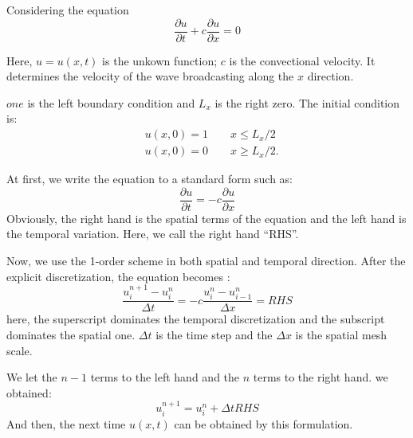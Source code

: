 \documentclass[a4paper]{article}
\begin{document}
\fontsize{12pt}{20pt}\selectfont
Considering the equation
\begin{equation}
  \frac{\partial u}{\partial t}+c\frac{\partial u}{\partial x}=0
\end{equation}

Here, $u=u(x,t)$ is the unkown function; $c$ is the convectional velocity. It determines the velocity of the wave broadcasting along the $x$ direction.

$one$ is the left boundary condition and $L_x$ is the right zero.
The initial condition is:
\begin{equation}
  \begin{split}
  &u(x, 0)=1 \qquad   x\le L_x/2\\
  &u(x, 0)=0 \qquad   x\ge L_x/2.
  \end{split}
\end{equation}

At first, we write the equation to a standard form such as:
\begin{equation}
  \frac{\partial u}{\partial t}=-c\frac{\partial u}{\partial x}
\end{equation}
Obviously, the right hand is the spatial terms of the equation and the left hand is the temporal variation. Here, we call the right hand ``RHS''.

Now, we use the 1-order scheme in both spatial and temporal direction.
After the explicit discretization, the equation becomes :
\begin{equation}
\frac{u^{n+1}_i-u^n_i}{\Delta t}=-c\frac{u_i^n-u_{i-1}^n}{\Delta x}=RHS
\end{equation}
here, the superscript dominates the temporal discretization and the subscript dominates the spatial one. $\Delta t$ is the time step and the $\Delta x$ is the spatial mesh scale.

 We let the $n-1$ terms to the left hand and the $n$ terms to the right hand. we obtained:
\begin{equation}
u^{n+1}_i=u^n_i+\Delta t RHS
\end{equation}
And then, the next time $u(x, t)$ can be obtained by this formulation.
\end{document}

